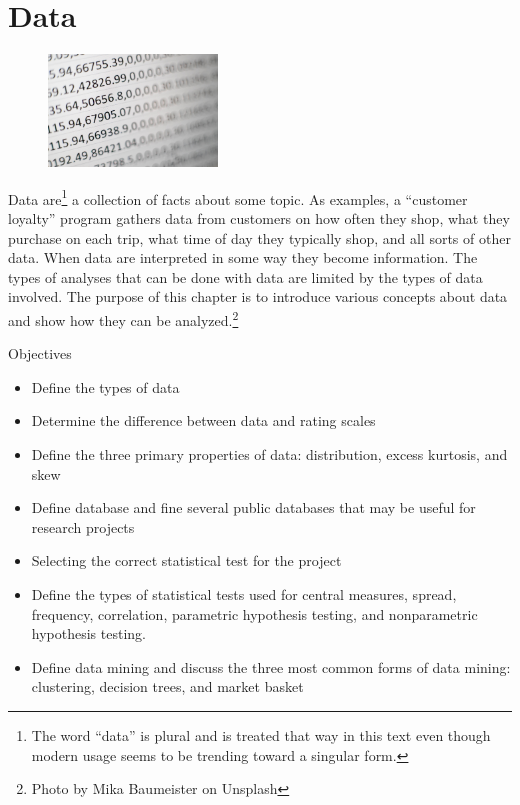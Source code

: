 \chapter{Data}\label{06:data}

\begin{figure}
	\label{06:fig01} 
	\centering
	\includegraphics[width=0.4\textwidth]{gfx/06-data} 
\end{figure}
Data are\footnote{The word ``data'' is plural and is treated that way in this text even though modern usage seems to be trending toward a singular form.} a collection of facts about some topic. As examples, a ``customer loyalty'' program gathers data from customers on how often they shop, what they purchase on each trip, what time of day they typically shop, and all sorts of other data. When data are interpreted in some way they become information. The types of analyses that can be done with data are limited by the types of data involved. The purpose of this chapter is to introduce various concepts about data and show how they can be analyzed.\footnote{Photo by Mika Baumeister on Unsplash}

\begin{center}
	\begin{objbox}{Objectives}
		\begin{itemize}
			\setlength{\itemsep}{0pt}
			\setlength{\parskip}{0pt}
			\setlength{\parsep}{0pt}
			
			\item Define the types of data
			\item Determine the difference between data and rating scales
			\item Define the three primary properties of data: distribution, excess kurtosis, and skew
			\item Define database and fine several public databases that may be useful for research projects
			\item Selecting the correct statistical test for the project
			\item Define the types of statistical tests used for central measures, spread, frequency, correlation, parametric hypothesis testing, and nonparametric hypothesis testing.
			\item Define data mining and discuss the three most common forms of data mining: clustering, decision trees, and market basket
		\end{itemize}
	\end{objbox}
\end{center}



